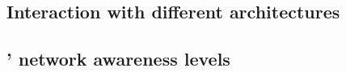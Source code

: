 

\subsection{Interaction with different architectures}


\subsection{\texorpdfstring{'}{RMs'} network awareness levels} \label{rm_network_awereness}
